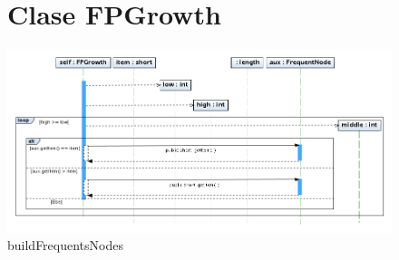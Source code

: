 % 
% 

\begin{figure}
\section{Clase FPGrowth}
\centering
\includegraphics[width=1.2\textwidth]{FPGrowth/findNode.png}
\caption{buildFrequentsNodes}
\end{figure}
\newpage
